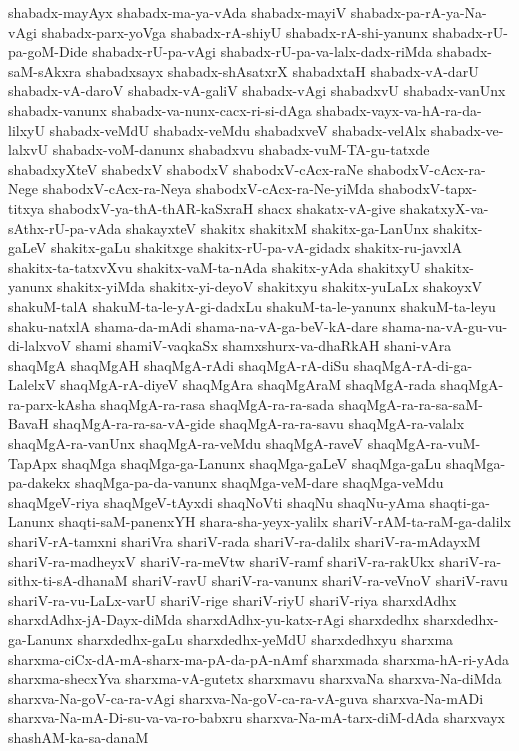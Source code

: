 {shabadx-mayAyx
shabadx-ma-ya-vAda
shabadx-mayiV
shabadx-pa-rA-ya-Na-vAgi
shabadx-parx-yoVga
shabadx-rA-shiyU
shabadx-rA-shi-yanunx
shabadx-rU-pa-goM-Dide
shabadx-rU-pa-vAgi
shabadx-rU-pa-va-lalx-dadx-riMda
shabadx-saM-sAkxra
shabadxsayx
shabadx-shAsatxrX
shabadxtaH
shabadx-vA-darU
shabadx-vA-daroV
shabadx-vA-galiV
shabadx-vAgi
shabadxvU
shabadx-vanUnx
shabadx-vanunx
shabadx-va-nunx-cacx-ri-si-dAga
shabadx-vayx-va-hA-ra-da-lilxyU
shabadx-veMdU
shabadx-veMdu
shabadxveV
shabadx-velAlx
shabadx-ve-lalxvU
shabadx-voM-danunx
shabadxvu
shabadx-vuM-TA-gu-tatxde
shabadxyXteV
shabedxV
shabodxV
shabodxV-cAcx-raNe
shabodxV-cAcx-ra-Nege
shabodxV-cAcx-ra-Neya
shabodxV-cAcx-ra-Ne-yiMda
shabodxV-tapx-titxya
shabodxV-ya-thA-thAR-kaSxraH
shacx
shakatx-vA-give
shakatxyX-va-sAthx-rU-pa-vAda
shakayxteV
shakitx
shakitxM
shakitx-ga-LanUnx
shakitx-gaLeV
shakitx-gaLu
shakitxge
shakitx-rU-pa-vA-gidadx
shakitx-ru-javxlA
shakitx-ta-tatxvXvu
shakitx-vaM-ta-nAda
shakitx-yAda
shakitxyU
shakitx-yanunx
shakitx-yiMda
shakitx-yi-deyoV
shakitxyu
shakitx-yuLaLx
shakoyxV
shakuM-talA
shakuM-ta-le-yA-gi-dadxLu
shakuM-ta-le-yanunx
shakuM-ta-leyu
shaku-natxlA
shama-da-mAdi
shama-na-vA-ga-beV-kA-dare
shama-na-vA-gu-vu-di-lalxvoV
shami
shamiV-vaqkaSx
shamxshurx-va-dhaRkAH
shani-vAra
shaqMgA
shaqMgAH
shaqMgA-rAdi
shaqMgA-rA-diSu
shaqMgA-rA-di-ga-LalelxV
shaqMgA-rA-diyeV
shaqMgAra
shaqMgAraM
shaqMgA-rada
shaqMgA-ra-parx-kAsha
shaqMgA-ra-rasa
shaqMgA-ra-ra-sada
shaqMgA-ra-ra-sa-saM-BavaH
shaqMgA-ra-ra-sa-vA-gide
shaqMgA-ra-ra-savu
shaqMgA-ra-valalx
shaqMgA-ra-vanUnx
shaqMgA-ra-veMdu
shaqMgA-raveV
shaqMgA-ra-vuM-TapApx
shaqMga
shaqMga-ga-Lanunx
shaqMga-gaLeV
shaqMga-gaLu
shaqMga-pa-dakekx
shaqMga-pa-da-vanunx
shaqMga-veM-dare
shaqMga-veMdu
shaqMgeV-riya
shaqMgeV-tAyxdi
shaqNoVti
shaqNu
shaqNu-yAma
shaqti-ga-Lanunx
shaqti-saM-panenxYH
shara-sha-yeyx-yalilx
shariV-rAM-ta-raM-ga-dalilx
shariV-rA-tamxni
shariVra
shariV-rada
shariV-ra-dalilx
shariV-ra-mAdayxM
shariV-ra-madheyxV
shariV-ra-meVtw
shariV-ramf
shariV-ra-rakUkx
shariV-ra-sithx-ti-sA-dhanaM
shariV-ravU
shariV-ra-vanunx
shariV-ra-veVnoV
shariV-ravu
shariV-ra-vu-LaLx-varU
shariV-rige
shariV-riyU
shariV-riya
sharxdAdhx
sharxdAdhx-jA-Dayx-diMda
sharxdAdhx-yu-katx-rAgi
sharxdedhx
sharxdedhx-ga-Lanunx
sharxdedhx-gaLu
sharxdedhx-yeMdU
sharxdedhxyu
sharxma
sharxma-ciCx-dA-mA-sharx-ma-pA-da-pA-nAmf
sharxmada
sharxma-hA-ri-yAda
sharxma-shecxYva
sharxma-vA-gutetx
sharxmavu
sharxvaNa
sharxva-Na-diMda
sharxva-Na-goV-ca-ra-vAgi
sharxva-Na-goV-ca-ra-vA-guva
sharxva-Na-mADi
sharxva-Na-mA-Di-su-va-va-ro-babxru
sharxva-Na-mA-tarx-diM-dAda
sharxvayx
shashAM-ka-sa-danaM
}
